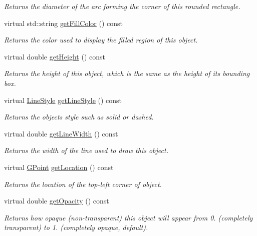 \begin{DoxyCompactItemize}
\begin{DoxyCompactList}\small\item\em Returns the diameter of the arc forming the corner of this rounded rectangle. \end{DoxyCompactList}\item 
virtual std\+::string \mbox{\hyperlink{classsgl_1_1GObject_a76f6964a11fde7c78e9751be184e1a3c}{get\+Fill\+Color}} () const
\begin{DoxyCompactList}\small\item\em Returns the color used to display the filled region of this object. \end{DoxyCompactList}\item 
virtual double \mbox{\hyperlink{classsgl_1_1GObject_a1e7e353362434072875264cf95629f99}{get\+Height}} () const
\begin{DoxyCompactList}\small\item\em Returns the height of this object, which is the same as the height of its bounding box. \end{DoxyCompactList}\item 
virtual \mbox{\hyperlink{classsgl_1_1GObject_a86e0f5648542856159bb40775c854aa7}{Line\+Style}} \mbox{\hyperlink{classsgl_1_1GObject_aaf1f5ea8281e5e3486662878d26f0a13}{get\+Line\+Style}} () const
\begin{DoxyCompactList}\small\item\em Returns the object\textquotesingle{}s style such as solid or dashed. \end{DoxyCompactList}\item 
virtual double \mbox{\hyperlink{classsgl_1_1GObject_a85ff266dc3eb63d9f2d8e5a4487fd3c0}{get\+Line\+Width}} () const
\begin{DoxyCompactList}\small\item\em Returns the width of the line used to draw this object. \end{DoxyCompactList}\item 
virtual \mbox{\hyperlink{structsgl_1_1GPoint}{G\+Point}} \mbox{\hyperlink{classsgl_1_1GObject_a4f83802015511edeb63b892830812c11}{get\+Location}} () const
\begin{DoxyCompactList}\small\item\em Returns the location of the top-\/left corner of object. \end{DoxyCompactList}\item 
virtual double \mbox{\hyperlink{classsgl_1_1GObject_a1ae3fc278cc5b71b9f2d96a8a83cdf26}{get\+Opacity}} () const
\begin{DoxyCompactList}\small\item\em Returns how opaque (non-\/transparent) this object will appear from 0. (completely transparent) to 1. (completely opaque, default). \end{DoxyCompactList}\item 

\end{DoxyCompactItemize}

